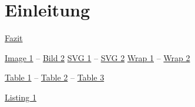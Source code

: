 \chapter{Einleitung}\label{ch:intro}
\hyperref[ch:conclusion]{Fazit}

\autocite{CleanCode}
\newline \autocite[S.12]{CleanCode}
\newline \autocite[vgl.][S.12]{CleanCode}

\hyperref[fig:example-image-1]{Image 1} -- \hyperref[fig:example-image-2]{Bild 2}
\hyperref[fig:example-svg-1]{SVG 1} -- \hyperref[fig:example-svg-2]{SVG 2}
\hyperref[fig:example-wrap-1]{Wrap 1} -- \hyperref[fig:example-wrap-2]{Wrap 2}

\hyperref[tab:example-table-1]{Table 1} -- \hyperref[tab:example-table-2]{Table 2} -- \hyperref[tab:example-table-3]{Table 3}

\hyperref[lst:example-lst-1]{Listing 1}

\tk
\\
\json